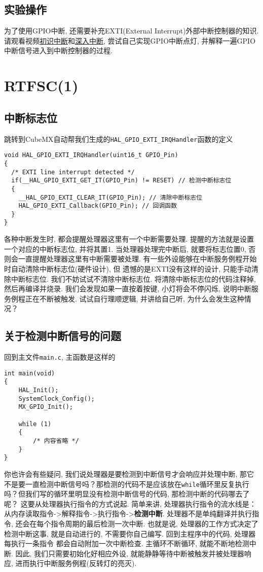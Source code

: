 \subsection{实验操作}
为了使用GPIO中断, 还需要补充EXTI(External Interrupt)外部中断控制器的知识. 请观看视频\href{【【keysking的stm32教程】 第6集 狂飙STM32中断】 https://www.bilibili.com/video/BV1Fj411V7aq/?share_source=copy_web&vd_source=00b9d329964a93c9843f9c524074f948}{初识中断}和\href{https://www.bilibili.com/video/BV1M24y1473t/?share_source=copy_web&vd_source=00b9d329964a93c9843f9c524074f948}{深入中断},
尝试自己实现GPIO中断点灯, 并解释一遍GPIO中断信号进入到中断控制器的过程.

\section{RTFSC(1)}
\subsection{中断标志位}
跳转到CubeMX自动帮我们生成的\verb|HAL_GPIO_EXTI_IRQHandler|函数的定义
\begin{lstlisting}
void HAL_GPIO_EXTI_IRQHandler(uint16_t GPIO_Pin)
{
  /* EXTI line interrupt detected */
  if(__HAL_GPIO_EXTI_GET_IT(GPIO_Pin) != RESET) // 检测中断标志位
  {
    __HAL_GPIO_EXTI_CLEAR_IT(GPIO_Pin); // 清除中断标志位
    HAL_GPIO_EXTI_Callback(GPIO_Pin); // 回调函数
  }
}
\end{lstlisting}
各种中断发生时, 都会提醒处理器这里有一个中断需要处理. 提醒的方法就是设置一个对应的中断标志位, 并将其置1. 当处理器处理完中断后, 就要将标志位置0, 否则会一直提醒处理器这里有中断需要被处理. 有一些外设能够在中断服务例程开始时自动清除中断标志位(硬件设计), 但
遗憾的是EXTI没有这样的设计, 只能手动清除中断标志位. 我们不妨试试不清除中断标志位. 将清除中断标志位的代码注释掉, 然后再编译并烧录. 我们会发现如果一直按着按键, 小灯将会不停闪烁, 说明中断服务例程正在不断被触发.
试试自行理顺逻辑, 并讲给自己听, 为什么会发生这种情况？

\subsection{关于检测中断信号的问题}
回到主文件\verb|main.c|, 主函数是这样的
\begin{lstlisting}
int main(void) 
{
    HAL_Init();
    SystemClock_Config();
    MX_GPIO_Init();

    while (1)
    {
        /* 内容省略 */
    }
}
\end{lstlisting}
你也许会有些疑问, 我们说处理器是要检测到中断信号才会响应并处理中断, 那它不是要一直检测中断信号吗？那检测的代码不是应该放在\verb|while|循环里反复执行吗？但我们写的循环里明显没有检测中断信号的代码, 那检测中断的代码哪去了呢？
这要从处理器执行指令的方式说起. 简单来讲, 处理器执行指令的流水线是：从内存读取指令->解释指令->执行指令->{\bf 检测中断}. 处理器不是单纯翻译并执行指令,
还会在每个指令周期的最后检测一次中断. 也就是说, 处理器的工作方式决定了检测中断这事, 就是自动进行的, 不需要你自己编写. 回到主程序中的代码, 处理器每执行一条指令
都会自动附加一次中断检查. 主循环不断循环, 就能不断地检测中断. 因此, 我们只需要初始化好相应外设, 就能静静等待中断被触发并被处理器响应, 进而执行中断服务例程(反转灯的亮灭).

